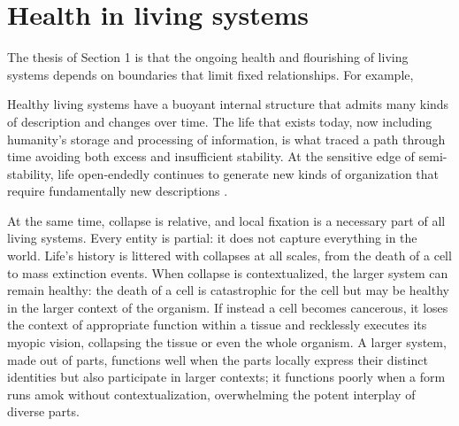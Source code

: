 \documentclass[11pt]{article}
\begin{document}
\section{Health in living systems}


The thesis of Section 1 is that the ongoing health and flourishing of living systems depends on boundaries that limit fixed relationships. For example, 

Healthy living systems have a buoyant internal structure that admits many kinds of description and changes over time. The life that exists today, now including humanity's storage and processing of information, is what traced a path through time avoiding both excess and insufficient stability. At the sensitive edge of semi-stability, life open-endedly continues to generate new kinds of organization that require fundamentally new descriptions \citep{kauffman1993origins, stanley2017open, canguilhem1966normal, langton1990computation, schrodinger1944what, prigogine1984order, maturana2012autopoiesis, simon1962architecture, moreno2015biological}. 


At the same time, collapse is relative, and local fixation is a necessary part of all living systems. Every entity is partial: it does not capture everything in the world. Life's history is littered with collapses at all scales, from the death of a cell to mass extinction events. When collapse is contextualized, the larger system can remain healthy: the death of a cell is catastrophic for the cell but may be healthy in the larger context of the organism. If instead a cell becomes cancerous, it loses the context of appropriate function within a tissue and recklessly executes its myopic vision, collapsing the tissue or even the whole organism. A larger system, made out of parts, functions well when the parts locally express their distinct identities but also participate in larger contexts; it functions poorly when a form runs amok without contextualization, overwhelming the potent interplay of diverse parts.
\end{document}
